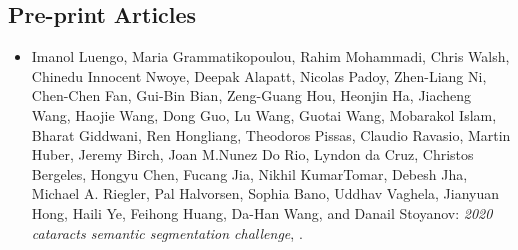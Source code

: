 \subsection*{Pre-print Articles}
\begin{itemize}
    \item Imanol Luengo, Maria Grammatikopoulou, Rahim Mohammadi, Chris Walsh, Chinedu Innocent Nwoye, Deepak Alapatt, Nicolas Padoy, Zhen-Liang Ni, Chen-Chen Fan, Gui-Bin Bian, Zeng-Guang Hou, Heonjin Ha, Jiacheng Wang, Haojie Wang, Dong Guo, Lu Wang, Guotai Wang, Mobarakol Islam, Bharat Giddwani, Ren Hongliang, Theodoros Pissas, Claudio Ravasio, Martin Huber, Jeremy Birch, Joan M.Nunez Do Rio, Lyndon da Cruz, Christos Bergeles, Hongyu Chen, Fucang Jia, Nikhil KumarTomar, Debesh Jha, Michael A. Riegler, Pal Halvorsen, Sophia Bano, Uddhav Vaghela, Jianyuan Hong, Haili Ye, Feihong Huang, Da-Han Wang, and Danail Stoyanov: \textit{2020 cataracts semantic segmentation challenge}, \cite{luengo20212020}.
\end{itemize}
